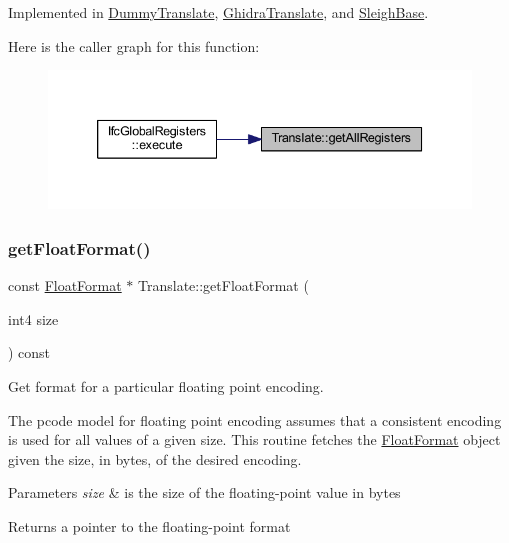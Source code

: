Implemented in \mbox{\hyperlink{class_dummy_translate_a6a27ba7b3c1826c28a5b20d6d6609717}{Dummy\+Translate}}, \mbox{\hyperlink{class_ghidra_translate_af27964c522d8004ace3d7b6b661e2f60}{Ghidra\+Translate}}, and \mbox{\hyperlink{class_sleigh_base_a4955cd43fdbc36936982f32850bac0ed}{Sleigh\+Base}}.

Here is the caller graph for this function\+:
\nopagebreak
\begin{figure}[H]
\begin{center}
\leavevmode
\includegraphics[width=339pt]{class_translate_a4de12a5d1ad5f080604451e2ed3c163e_icgraph}
\end{center}
\end{figure}
\mbox{\label{class_translate_ae501a3e3bdaee00d49ed9f2b8545e6c8}} 
\subsubsection{\texorpdfstring{getFloatFormat()}{getFloatFormat()}}
{\footnotesize\ttfamily const \mbox{\hyperlink{class_float_format}{Float\+Format}} $\ast$ Translate\+::get\+Float\+Format (\begin{DoxyParamCaption}\item[{int4}]{size }\end{DoxyParamCaption}) const}



Get format for a particular floating point encoding. 

The pcode model for floating point encoding assumes that a consistent encoding is used for all values of a given size. This routine fetches the \mbox{\hyperlink{class_float_format}{Float\+Format}} object given the size, in bytes, of the desired encoding. 
\begin{DoxyParams}{Parameters}
{\em size} & is the size of the floating-\/point value in bytes \\
\hline
\end{DoxyParams}
\begin{DoxyReturn}{Returns}
a pointer to the floating-\/point format 
\end{DoxyReturn}


